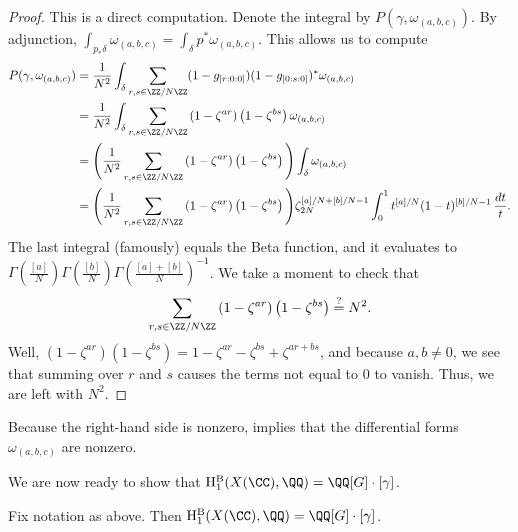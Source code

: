 \documentclass[../thesis.tex]{subfiles}
\begin{document}
\begin{proof}
	This is a direct computation. Denote the integral by $P(\gamma,\omega_{(a,b,c)})$. By adjunction, $\int_{p_*\delta}\omega_{(a,b,c)}=\int_\delta p^*\omega_{(a,b,c)}$. This allows us to compute
	\begin{align*}
		P(\gamma,\omega_{(a,b,c)}) &= \frac1{N^2}\int_\delta\sum_{r,s\in\ZZ/N\ZZ}(1-g_{[r:0:0]})(1-g_{[0:s:0]})^*\omega_{(a,b,c)} \\
		&= \frac1{N^2}\int_\delta\sum_{r,s\in\ZZ/N\ZZ}\left(1-\zeta^{ar}\right)\left(1-\zeta^{bs}\right)\omega_{(a,b,c)} \\
		&= \Bigg(\frac1{N^2}\sum_{r,s\in\ZZ/N\ZZ}\left(1-\zeta^{ar}\right)\left(1-\zeta^{bs}\right)\Bigg)\int_\delta\omega_{(a,b,c)} \\
		&= \Bigg(\frac1{N^2}\sum_{r,s\in\ZZ/N\ZZ}\left(1-\zeta^{ar}\right)\left(1-\zeta^{bs}\right)\Bigg)\zeta_{2N}^{[a]/N+[b]/N-1}\int_0^1t^{[a]/N}(1-t)^{[b]/N-1}\,\frac{dt}t.
	\end{align*}
	The last integral (famously) equals the Beta function, and it evaluates to $\Gamma\left(\frac{[a]}N\right)\Gamma\left(\frac{[b]}N\right)\Gamma\left(\frac{[a]+[b]}N\right)^{-1}$. We take a moment to check that
	\[\sum_{r,s\in\ZZ/N\ZZ}\left(1-\zeta^{ar}\right)\left(1-\zeta^{bs}\right)\stackrel?=N^2.\]
	Well, $\left(1-\zeta^{ar}\right)\left(1-\zeta^{bs}\right)=1-\zeta^{ar}-\zeta^{bs}+\zeta^{ar+bs}$, and because $a,b\ne0$, we see that summing over $r$ and $s$ causes the terms not equal to $0$ to vanish. Thus, we are left with $N^2$.
\end{proof}
\begin{remark} \label{rem:nonzero-form-period}
	Because the right-hand side is nonzero,  implies that the differential forms $\omega_{(a,b,c)}$ are nonzero.
\end{remark}
We are now ready to show that $\mathrm H_1^{\mathrm B}(X(\CC),\QQ)=\QQ[G]\cdot[\gamma]$.
\begin{lemma}
	Fix notation as above. Then $\mathrm H_1^{\mathrm B}(X(\CC),\QQ)=\QQ[G]\cdot[\gamma]$.
\end{lemma}
\end{document}
